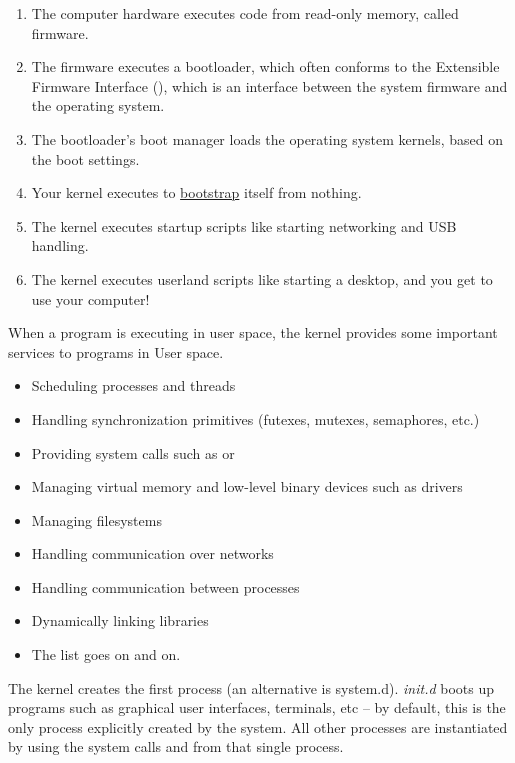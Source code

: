 \begin{enumerate}
\item The computer hardware executes code from read-only memory, called firmware.
\item The firmware executes a bootloader, which often conforms to the Extensible Firmware Interface (), which is an interface between the system firmware and the operating system.
\item The bootloader's boot manager loads the operating system kernels, based on the boot settings.
\item
  Your kernel executes  to \href{https://en.wikipedia.org/wiki/Bootstrapping}{bootstrap} itself from nothing.
\item The kernel executes startup scripts like starting networking and USB handling.
\item The kernel executes userland scripts like starting a desktop, and you get to use your computer!
\end{enumerate}

When a program is executing in user space, the kernel provides some important services to programs in User space.

\begin{itemize}
\item Scheduling processes and threads
\item Handling synchronization primitives (futexes, mutexes, semaphores, etc.)
\item Providing system calls such as  or 
\item Managing virtual memory and low-level binary devices such as  drivers
\item Managing filesystems
\item Handling communication over networks
\item Handling communication between processes
\item Dynamically linking libraries
\item The list goes on and on.
\end{itemize}

The kernel creates the first process  (an alternative is system.d).
\emph{init.d} boots up programs such as graphical user interfaces, terminals, etc -- by default, this is the only process explicitly created by the system.
All other processes are instantiated by using the system calls  and  from that single process.

